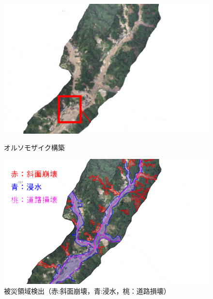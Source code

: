 \documentclass[a4paper, twocolumn, xelatex, 10pt, ja=standard, Ligatures=TeX]{bxjsarticle}
\begin{document}
	\begin{figure}[t]
		\begin{minipage}{0.48\hsize}
			\centering
			\includegraphics[width=\linewidth]{img/ortho.png}
			\caption{オルソモザイク構築}
			\label{img04}
		\end{minipage}
		\begin{minipage}{0.48\hsize}
			\centering
			\includegraphics[width=\linewidth]{img/detection.png}
			\caption{被災領域検出（赤:斜面崩壊，青:浸水，桃：道路損壊）}
			\label{img05}
		\end{minipage}
	\end{figure}
\end{document}
